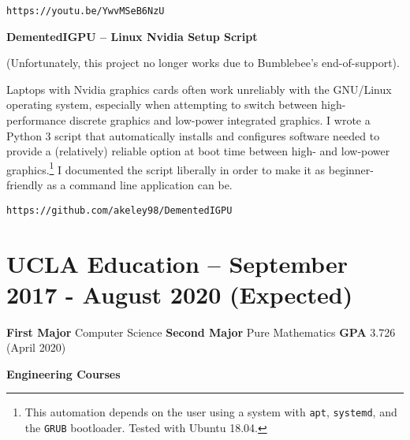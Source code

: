 \documentclass[11pt]{article}
\begin{document}
\quad\texttt{https://youtu.be/YwvMSeB6NzU}

\textbf{DementedIGPU -- Linux Nvidia Setup Script}

(Unfortunately, this project no longer works due to Bumblebee's
end-of-support).

Laptops with Nvidia graphics cards often work unreliably with the
GNU/Linux operating system, especially when attempting to switch
between high-performance discrete graphics and low-power integrated
graphics. I wrote a Python 3 script that automatically installs and
configures software needed to provide a (relatively) reliable option
at boot time between high- and low-power graphics.\footnote{This
  automation depends on the user using a system with \texttt{apt},
  \texttt{systemd}, and the \texttt{GRUB} bootloader. Tested with
  Ubuntu 18.04.} I documented the script liberally in order to make it
as beginner-friendly as a command line application can be.

\quad\texttt{https://github.com/akeley98/DementedIGPU}

\section{UCLA Education -- September 2017 - August 2020 (Expected)}

\textbf{First Major} Computer Science \hfill\textbf{Second Major} Pure
Mathematics \hfill\textbf{GPA} 3.726 (April 2020) %


\textbf{Engineering Courses}
\end{document}
